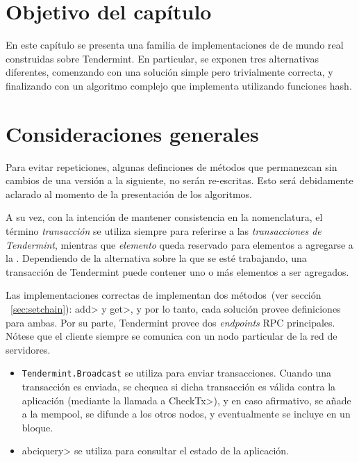 \section{Objetivo del capítulo}

En este capítulo se presenta una familia de implementaciones de \setchain de mundo
real construidas sobre Tendermint.
%
En particular, se exponen tres alternativas diferentes, comenzando con una
solución simple pero trivialmente correcta, y finalizando con un algoritmo
complejo que implementa \setchain utilizando funciones hash.
%

\section{Consideraciones generales}\label{sec:impl}
Para evitar repeticiones, algunas definciones de métodos que permanezcan sin cambios
de una versión a la siguiente, no serán re-escritas.
Esto será debidamente aclarado al momento de la presentación de los algoritmos.

%
A su vez, con la intención de mantener consistencia en la nomenclatura,
el término \textit{transacción} se utiliza siempre para referirse a las
\textit{transacciones de Tendermint}, mientras
que \textit{elemento} queda reservado para elementos a agregarse a la \setchain.
%
Dependiendo de la alternativa sobre la que se esté trabajando, una transacción de
Tendermint puede contener uno o más elementos a ser agregados.
%

Las implementaciones correctas de \setchain implementan dos métodos~(ver sección
~\ref{sec:setchain}): \<add> y \<get>, y por lo tanto, cada solución provee definiciones
para ambas.
%
Por su parte, Tendermint provee dos \textit{endpoints} RPC principales.
Nótese que el cliente siempre se comunica con un nodo particular de la red de servidores.
\begin{itemize}
  \item \texttt{Tendermint.Broadcast} se utiliza para enviar transacciones.
  Cuando una transacción es enviada, se chequea si dicha transacción
  es válida contra la aplicación (mediante la llamada a \<CheckTx>), y en caso
  afirmativo, se añade
  a la mempool, se difunde a los otros nodos, y eventualmente se incluye en
  un bloque.
  \item \<abciquery> se utiliza para consultar el estado de la
  aplicación.
\end{itemize}
%

